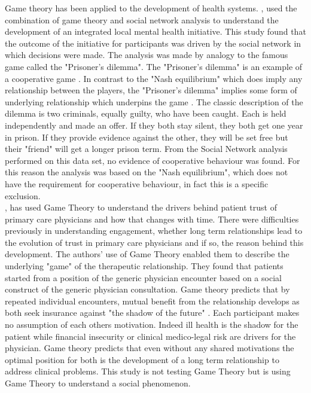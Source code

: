 \documentclass[11pt,a4paper]{article}
\begin{document}
Game theory has been applied to the development of health systems. \citep{dobson2004sustainable}, used the combination of game theory and social network analysis to understand the development of an integrated local mental health initiative. This study found that the outcome of the initiative for participants was driven by the social network in which decisions were made. The analysis was made by analogy to the famous game called the "Prisoner's dilemma". The "Prisoner's dilemma" is an example of a cooperative game \citep{binmore2007}. In contrast to the "Nash equilibrium" which does imply any relationship between the players, the "Prisoner's dilemma" implies some form of underlying relationship which underpins the game \citep{binmore2007game}. The classic description of the dilemma is two criminals, equally guilty, who have been caught. Each is held independently and made an offer. If they both stay silent, they both get one year in prison. If they provide evidence against the other, they will be set free but their "friend" will get a longer prison term. From the Social Network analysis performed on this data set, no evidence of cooperative behaviour was found. For this reason the analysis was based on the "Nash equilibrium", which does not have the requirement for cooperative behaviour, in fact this is a specific exclusion. \\

\citet{tarrant2010continuity}, has used Game Theory to understand the drivers behind patient trust of primary care physicians and how that changes with time. There were difficulties previously in understanding engagement, whether long term relationships lead to the evolution of trust in primary care physicians and if so, the reason behind this development. The authors' use of Game Theory enabled them to describe the underlying "game" of the therapeutic relationship. They found that patients started from a position of the generic physician encounter based on a social construct of the generic physician consultation. Game theory predicts that by repeated individual encounters, mutual benefit from the relationship develops as both seek insurance against "the shadow of the future" \citep{tarrant2010continuity}. Each participant makes no assumption of each others motivation. Indeed ill health is the shadow for the patient while financial insecurity or clinical medico-legal risk  are drivers for the physician. Game theory predicts that even without any shared motivations the optimal position for both is the development of a long term relationship to address clinical problems.  This study is not testing Game Theory but is using Game Theory to understand a social phenomenon. \\
\end{document}

